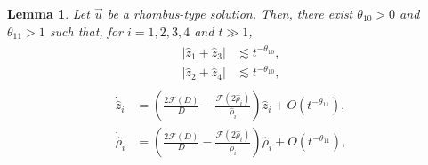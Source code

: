 \documentclass[10pt,a4paper]{amsart}
\newtheorem{lemma}[theorem]{Lemma}
\numberwithin{equation}{section}
\begin{document}
\begin{lemma}\label{rhombodekai}
Let $\vec{u}$ be a rhombus-type solution. Then, there exist $\theta_{10}>0$ and  $\theta_{11}>1$ such that, for $i=1,2,3,4$ and $t\gg 1$,
\begin{align}\label{hayzyoujunbi}
\begin{aligned}
\left|\hat{z}_1+\hat{z}_3\right|&\lesssim t^{-\theta_{10}},
\\
\left|\hat{z}_2+\hat{z}_4\right|&\lesssim t^{-\theta_{10}},
\end{aligned}
\end{align}
\begin{align}\label{hatzioderhomb}
\begin{aligned}
\dot{\hat{z}}_i&=\left(\frac{2\mathcal{F}(D)}{D}-\frac{\mathcal{F}(2\hat{\rho}_i)}{\hat{\rho}_i}\right)\hat{z}_i+O\left(t^{-\theta_{11}}\right),
\\
\dot{\hat{\rho}}_i&=\left(\frac{2\mathcal{F}(D)}{D}-\frac{\mathcal{F}(2\hat{\rho}_i)}{\hat{\rho}_i}\right)\hat{\rho}_i+O\left(t^{-\theta_{11}}\right),
\end{aligned}
\end{align}
\end{lemma}
\end{document}
